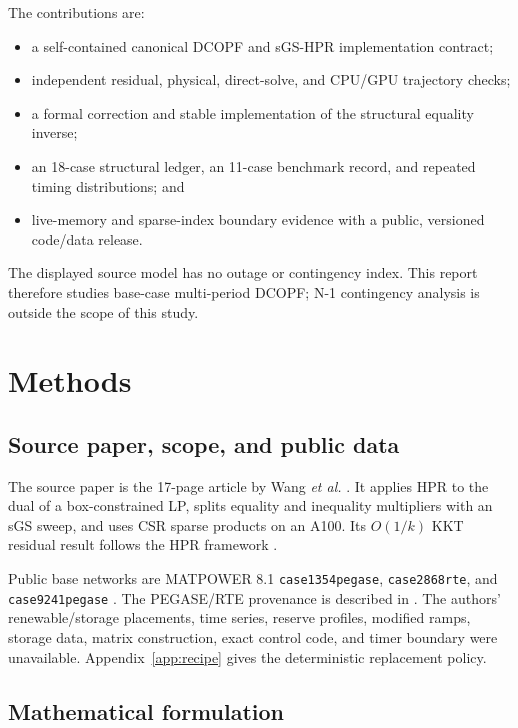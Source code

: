\documentclass[10pt,journal]{IEEEtran}
\newcommand{\sgshpr}{sGS-HPR}
\begin{document}
The contributions are:
\begin{itemize}
  \item a self-contained canonical DCOPF and \sgshpr{} implementation
  contract;
  \item independent residual, physical, direct-solve, and CPU/GPU trajectory
  checks;
  \item a formal correction and stable implementation of the structural
  equality inverse;
  \item an 18-case structural ledger, an 11-case benchmark record, and
  repeated timing distributions; and
  \item live-memory and sparse-index boundary evidence with a public,
  versioned code/data release.
\end{itemize}

The displayed source model has no outage or contingency index. This report
therefore studies base-case multi-period DCOPF; N-1 contingency analysis is
outside the scope of this study.

\section{Methods}

\subsection{Source paper, scope, and public data}

The source paper is the 17-page article by Wang \emph{et al.}
\cite{wang2026}. It applies HPR to the dual of a box-constrained LP, splits equality and
inequality multipliers with an sGS sweep, and uses CSR sparse products on an
A100. Its $O(1/k)$ KKT residual result follows the HPR framework
\cite{chen2026}.

Public base networks are MATPOWER 8.1
\texttt{case1354pegase}, \texttt{case2868rte}, and
\texttt{case9241pegase} \cite{matpower,josz2016}. The PEGASE/RTE provenance is described in
\cite{fliscounakis2013,josz2016}. The authors' renewable/storage placements,
time series, reserve profiles, modified ramps, storage data, matrix
construction, exact control code, and timer boundary were unavailable.
Appendix~\ref{app:recipe} gives the deterministic replacement policy.

\subsection{Mathematical formulation}
\end{document}
